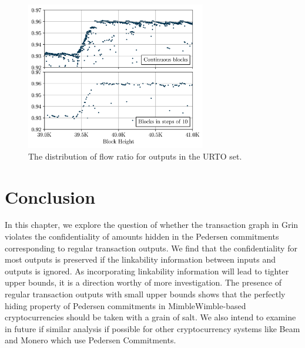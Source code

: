 \begin{figure}[!h]
    \centering
    \includegraphics[width=0.7\textwidth]{Figures/continuity_vs_steps.png}
    \caption{The distribution of flow ratio for outputs in the URTO set.}
    \label{continuity-plot}
\end{figure}
  







\section{Conclusion}
In this chapter, we explore the question of whether the transaction graph in Grin violates the confidentiality of amounts hidden in the Pedersen commitments corresponding to regular transaction outputs. We find that the confidentiality for most outputs is preserved if the linkability information between inputs and outputs is ignored. As incorporating linkability information will lead to tighter upper bounds, it is a direction worthy of more investigation. The presence of regular transaction outputs with small upper bounds shows that the perfectly hiding property of Pedersen commitments in MimbleWimble-based cryptocurrencies should be taken with a grain of salt.  
We also intend to examine in future if similar analysis if possible for other cryptocurrency systems like Beam and Monero which use Pedersen Commitments.


